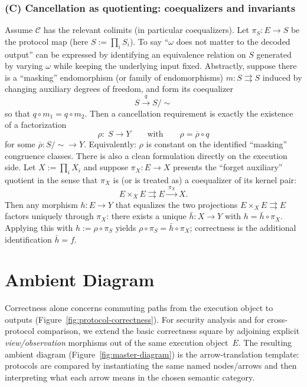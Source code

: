 \documentclass[11pt,a4paper]{article}
\theoremstyle{definition}
\theoremstyle{plain}
\begin{document}
\subsubsection{(C) Cancellation as quotienting: coequalizers and invariants}
\label{subsubsec:combine-cancel-quotient}
Assume $\mathcal{C}$ has the relevant colimits (in particular coequalizers).
Let $\pi_S:E\to S$ be the protocol map (here $S:=\prod_i S_i$).
To say ``$\omega$ does not matter to the decoded output'' can be expressed by identifying an equivalence relation on $S$ generated by varying $\omega$ while keeping the underlying input fixed.
Abstractly, suppose there is a ``masking'' endomorphism (or family of endomorphisms) $m:S\rightrightarrows S$ induced by changing auxiliary degrees of freedom, and form its coequalizer
\[
S \xrightarrow{q} S/{\sim}
\]
so that $q\circ m_1=q\circ m_2$.
Then a cancellation requirement is exactly the existence of a factorization
\[
\rho:\; S \longrightarrow Y
\qquad\text{with}\qquad
\rho=\overline{\rho}\circ q
\]
for some $\overline{\rho}:S/{\sim}\to Y$.
Equivalently: $\rho$ is constant on the identified ``masking'' congruence classes.
There is also a clean formulation directly on the execution side.
Let $X:=\prod_i X_i$ and suppose $\pi_X:E\to X$ presents the ``forget auxiliary'' quotient in the sense that $\pi_X$ is (or is treated as) a coequalizer of its kernel pair:
\[
E\times_X E \rightrightarrows E \xrightarrow{\ \pi_X\ } X.
\]
Then any morphism $h:E\to Y$ that equalizes the two projections $E\times_X E\rightrightarrows E$ factors uniquely through $\pi_X$:
there exists a unique $\bar h:X\to Y$ with $h=\bar h\circ \pi_X$.
Applying this with $h:=\rho\circ \pi_S$ yields $\rho\circ\pi_S=\bar h\circ \pi_X$; correctness is the additional identification $\bar h=f$.

\section{Ambient Diagram}
\label{sec:ambient-diagram-embeddings-note}

Correctness alone concerns commuting paths from the execution object to outputs (Figure~\ref{fig:protocol-correctness}).
For security analysis and for cross-protocol comparison, we extend the basic correctness square by adjoining explicit \emph{view/observation} morphisms out of the same execution object~$E$.
The resulting ambient diagram (Figure~\ref{fig:master-diagram}) is the arrow-translation template: protocols are compared by instantiating the same named nodes/arrows and then interpreting what each arrow means in the chosen semantic category.
\end{document}
